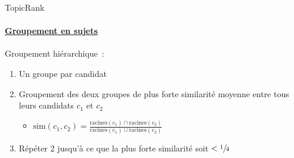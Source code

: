 \begin{frame}[label=groupement_en_sujets]{TopicRank}\framesubtitle{\hyperlink{topicrank_back}{Groupement en sujets}}
  Groupement hiérarchique~:
  \begin{enumerate}
    \item{Un groupe par candidat}
    \item{Groupement des deux groupes de plus forte similarité moyenne entre
      tous leurs candidats $c_1$ et $c_2$}
    \begin{itemize}
      \item{$\text{sim}(c_1, c_2) = \frac{\text{racines}(c_1) \cap \text{racines}(c_2)}{\text{racines}(c_1) \cup \text{racines}(c_2)}$}
    \end{itemize}
    \item{Répéter 2 jusqu'à ce que la plus forte similarité soit $< \sfrac{1}{4}$}
  \end{enumerate}
\end{frame}

